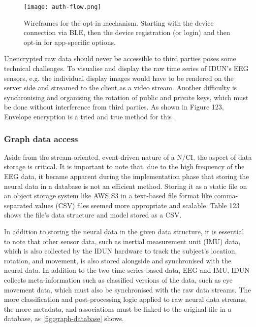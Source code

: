 \begin{figure}[!ht]
  \centering
  \texttt{[image: auth-flow.png]}
  \caption{Wireframes for the opt-in mechanism. Starting with the device connection via BLE, then the device registration (or login) and then opt-in for app-specific options.}
  \label{fig:auth-flow}
\end{figure}

Unencrypted raw data should never be accessible to third parties poses some technical challenges. To visualise and display the raw time series of IDUN's EEG sensors, e.g. the individual display images would have to be rendered on the server side and streamed to the client as a video stream. Another difficulty is synchronising and organising the rotation of public and private keys, which must be done without interference from third parties. As shown in Figure 123, Envelope encryption is a tried and true method for this \citep{google_cloud_envelope_nodate}.


\subsubsection{Graph data access}
\label{chapter5-graph-data-access}

Aside from the stream-oriented, event-driven nature of a N/CI, the aspect of data storage is critical. It is important to note that, due to the high frequency of the EEG data, it became apparent during the implementation phase that storing the neural data in a database is not an efficient method. Storing it as a static file on an object storage system like AWS S3 in a text-based file format like comma-separated values (CSV) files seemed more appropriate and scalable. Table 123 shows the file's data structure and model stored as a CSV.


In addition to storing the neural data in the given data structure, it is essential to note that other sensor data, such as inertial measurement unit (IMU) data, which is also collected by the IDUN hardware to track the subject's location, rotation, and movement, is also stored alongside and synchronised with the neural data. In addition to the two time-series-based data, EEG and IMU, IDUN collects meta-information such as classified versions of the data, such as eye movement data, which must also be synchronised with the raw data streams. The more classification and post-processing logic applied to raw neural data streams, the more metadata, and associations must be linked to the original file in a database, as \autoref{fig:graph-database} shows.

